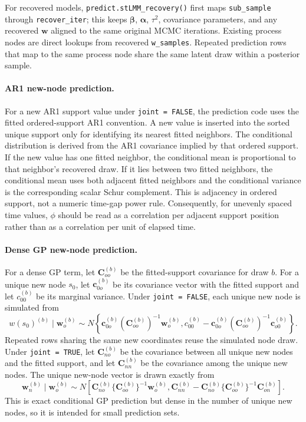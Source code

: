 \documentclass[11pt]{article}
\newcommand{\bw}{\bm{w}}
\newcommand{\balpha}{\bm{\alpha}}
\newcommand{\bbeta}{\bm{\beta}}
\newcommand{\bc}{\bm{c}}
\newcommand{\bC}{\bm{C}}
\begin{document}
For recovered models, \texttt{predict.stLMM\_recovery()} first maps \texttt{sub\_sample} through \texttt{recover\_iter}; this keeps $\bbeta$, $\balpha$, $\tau^2$, covariance parameters, and any recovered $\bw$ aligned to the same original MCMC iterations. Existing process nodes are direct lookups from recovered \texttt{w\_samples}. Repeated prediction rows that map to the same process node share the same latent draw within a posterior sample.

\paragraph{AR1 new-node prediction.}
For a new AR1 support value under \texttt{joint = FALSE}, the prediction code uses the fitted ordered-support AR1 convention. A new value is inserted into the sorted unique support only for identifying its nearest fitted neighbors. The conditional distribution is derived from the AR1 covariance implied by that ordered support. If the new value has one fitted neighbor, the conditional mean is proportional to that neighbor's recovered draw. If it lies between two fitted neighbors, the conditional mean uses both adjacent fitted neighbors and the conditional variance is the corresponding scalar Schur complement. This is adjacency in ordered support, not a numeric time-gap power rule. Consequently, for unevenly spaced time values, $\phi$ should be read as a correlation per adjacent support position rather than as a correlation per unit of elapsed time.

\paragraph{Dense GP new-node prediction.}
For a dense GP term, let $\bC_{oo}^{(b)}$ be the fitted-support covariance for draw $b$. For a unique new node $s_0$, let $\bc_{0o}^{(b)}$ be its covariance vector with the fitted support and let $c_{00}^{(b)}$ be its marginal variance. Under \texttt{joint = FALSE}, each unique new node is simulated from
\begin{equation}
  w(s_0)^{(b)} \mid \bw_o^{(b)}
  \sim N\left\{
    \bc_{0o}^{(b)} (\bC_{oo}^{(b)})^{-1} \bw_o^{(b)},
    c_{00}^{(b)} - \bc_{0o}^{(b)} (\bC_{oo}^{(b)})^{-1} \bc_{o0}^{(b)}
  \right\}.
\end{equation}
Repeated rows sharing the same new coordinates reuse the simulated node draw. Under \texttt{joint = TRUE}, let $\bC_{no}^{(b)}$ be the covariance between all unique new nodes and the fitted support, and let $\bC_{nn}^{(b)}$ be the covariance among the unique new nodes. The unique new-node vector is drawn exactly from
\begin{equation}
  \bw_n^{(b)} \mid \bw_o^{(b)}
  \sim N\left[
    \bC_{no}^{(b)} \{\bC_{oo}^{(b)}\}^{-1} \bw_o^{(b)},
    \bC_{nn}^{(b)}
      - \bC_{no}^{(b)} \{\bC_{oo}^{(b)}\}^{-1} \bC_{on}^{(b)}
  \right].
\end{equation}
This is exact conditional GP prediction but dense in the number of unique new nodes, so it is intended for small prediction sets.
\end{document}

